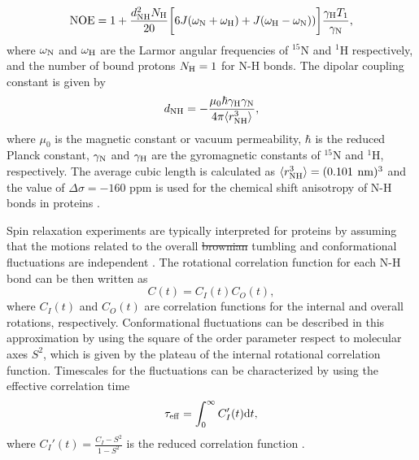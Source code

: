 \documentclass[journal=jpcbfk,manuscript=article]{achemso}
\providecommand{\DIFadd}[1]{{\protect\color{blue}\uwave{#1}}} %
\providecommand{\DIFdel}[1]{{\protect\color{red}\sout{#1}}}                      %
\providecommand{\DIFaddbegin}{} %
\providecommand{\DIFaddend}{} %
\providecommand{\DIFdelbegin}{} %
\providecommand{\DIFdelend}{} %
\begin{document}
\begin{equation}\label{NOE}
  {\rm NOE}=1+\frac{d_{\rm{NH}}^2N_{\rm{H}}}{20}\bigg[6J(\omega_{\rm{N}}+\omega_{\rm{H}})+J(\omega_{\rm{H}}-\omega_{\rm{N}}))\bigg]\frac{\gamma_{\rm{H}}T_1}{\gamma_{\rm{N}}},
\end{equation}
where $\omega_{\rm{N}}$ and $\omega_{\rm{H}}$ are the Larmor angular
frequencies of $^{15}$N and $^1$H respectively, and
the number of bound protons $N_{\rm{H}}=1$ for N-H bonds.
The dipolar coupling constant is given by
\begin{equation}
d_{\rm{NH}}=-\frac{\mu_0\hbar\gamma_{\rm{H}}\gamma_{\rm{N}}}{4\pi\langle r_{\rm{NH}}^3\rangle},\nonumber
\end{equation}
where $\mu_0$ is the magnetic constant or vacuum permeability, $\hbar$ is the reduced Planck constant,
$\gamma_{\rm{N}}$ and $\gamma_{\rm{H}}$ are the gyromagnetic constants of $^{15}$N and $^1$H, respectively.
The average cubic length is calculated as $\langle r_{\rm{NH}}^3\rangle = (0.101$ ${\rm nm})^3$ and the 
value of $\Delta \sigma = -160$ ppm is used for the chemical shift anisotropy of N-H bonds in 
proteins \cite{kay89,hiyama88}.

Spin relaxation experiments are typically interpreted for proteins by
assuming that the motions related to the overall \DIFdelbegin \DIFdel{brownian }\DIFdelend \DIFaddbegin \DIFadd{Brownian }\DIFaddend tumbling 
and conformational fluctuations are independent \DIFaddbegin \DIFadd{\mbox{%
\cite{halle09}}%
}\DIFaddend .
The rotational correlation function for each N-H bond can be then written
as  \cite{wennerstrom79,Lipari82,jarymowycz06,korzhnev01,halle09}
\begin{equation}\label{CORRFsep}
  C(t)=C_I(t)C_O(t),
\end{equation}
where $C_I(t)$ and $C_O(t)$ are correlation functions for the internal \DIFaddbegin \DIFadd{dynamics }\DIFaddend and overall
rotations, respectively. Conformational fluctuations can be described
in this approximation by using the square of the order parameter respect to 
molecular axes $S^2$, which is given by the plateau of the internal rotational 
correlation function. Timescales for the fluctuations can be characterized by
using the effective correlation time 
\begin{equation}\label{effCT}
  \tau_{\rm eff}=\int_0^\infty C_I'(t) \mathrm{d}t,
\end{equation}
where $C_I'(t)=\frac{C_I-S^2}{1-S^2}$ is the reduced correlation function \cite{Lipari82}.
\end{document}
